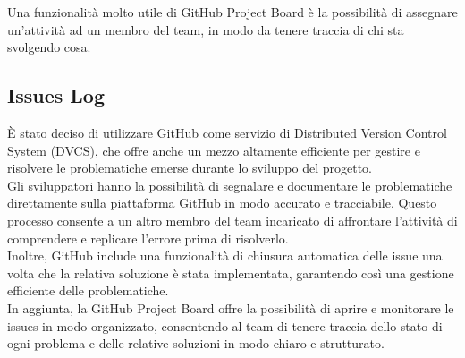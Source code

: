 Una funzionalità molto utile di GitHub Project Board è la possibilità di assegnare un'attività ad un membro del team, in modo da tenere traccia di chi sta svolgendo cosa.\\

\subsection{Issues Log}
È stato deciso di utilizzare GitHub come servizio di Distributed Version Control System (DVCS), che offre anche un mezzo altamente efficiente per gestire
e risolvere le problematiche emerse durante lo sviluppo del progetto. \\

Gli sviluppatori hanno la possibilità di segnalare e documentare
le problematiche direttamente sulla piattaforma GitHub in modo accurato e tracciabile. Questo processo consente a un altro membro del
team incaricato di affrontare l'attività di comprendere e replicare l'errore prima di risolverlo.\\

Inoltre, GitHub include una funzionalità
di chiusura automatica delle issue una volta che la relativa soluzione è stata implementata, garantendo così una gestione efficiente delle problematiche.\\

In aggiunta, la GitHub Project Board offre la possibilità di aprire e monitorare le issues in modo organizzato, consentendo al team di tenere traccia
dello stato di ogni problema e delle relative soluzioni in modo chiaro e strutturato.

